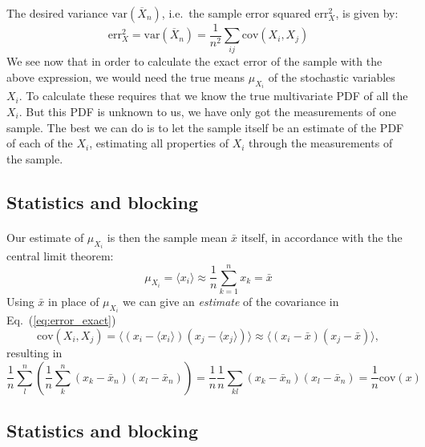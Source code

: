 \documentclass[%
twoside,                 %
final,                   %
10pt]{article}
\begin{document}
\paragraph{}
The desired variance
$\mathrm{var}(\overline X_n)$, i.e.~the sample error squared
$\mathrm{err}_X^2$, is given by:
\begin{equation}
\mathrm{err}_X^2 = \mathrm{var}(\overline X_n) = \frac{1}{n^2}
\sum_{ij} \mathrm{cov}(X_i, X_j)
\label{eq:error_exact}
\end{equation}
We see now that in order to calculate the exact error of the sample
with the above expression, we would need the true means
$\mu_{X_i}^{\phantom X}$ of the stochastic variables $X_i$. To
calculate these requires that we know the true multivariate PDF of all
the $X_i$. But this PDF is unknown to us, we have only got the measurements of
one sample. The best we can do is to let the sample itself be an
estimate of the PDF of each of the $X_i$, estimating all properties of
$X_i$ through the measurements of the sample.




\subsection{Statistics and blocking}

\paragraph{}
Our estimate of $\mu_{X_i}^{\phantom X}$ is then the sample mean $\bar x$
itself, in accordance with the the central limit theorem:
\[
\mu_{X_i}^{\phantom X} = \langle x_i\rangle \approx \frac{1}{n}\sum_{k=1}^n x_k = \bar x
\]
Using $\bar x$ in place of $\mu_{X_i}^{\phantom X}$ we can give an
\emph{estimate} of the covariance in Eq.~(\ref{eq:error_exact})
\[
\mathrm{cov}(X_i, X_j) = \langle (x_i-\langle x_i\rangle)(x_j-\langle x_j\rangle)\rangle
\approx\langle (x_i - \bar x)(x_j - \bar{x})\rangle,
\]
resulting in
\[ 
\frac{1}{n} \sum_{l}^n \left(\frac{1}{n}\sum_{k}^n (x_k -\bar x_n)(x_l - \bar x_n)\right)=\frac{1}{n}\frac{1}{n} \sum_{kl} (x_k -\bar x_n)(x_l - \bar x_n)=\frac{1}{n}\mathrm{cov}(x)
\]



\subsection{Statistics and blocking}
\end{document}
